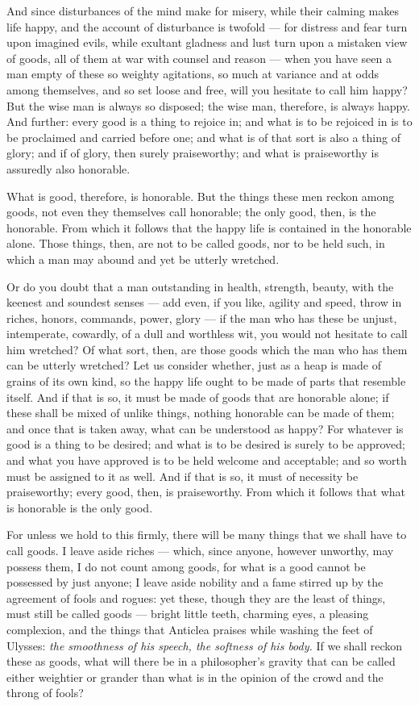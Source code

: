  And since disturbances of the mind make for misery, while their calming makes life happy, and the account of disturbance is twofold — for distress and fear turn upon imagined evils, while exultant gladness and lust turn upon a mistaken view of goods, all of them at war with counsel and reason — when you have seen a man empty of these so weighty agitations, so much at variance and at odds among themselves, and so set loose and free, will you hesitate to call him happy? But the wise man is always so disposed; the wise man, therefore, is always happy. And further: every good is a thing to rejoice in; and what is to be rejoiced in is to be proclaimed and carried before one; and what is of that sort is also a thing of glory; and if of glory, then surely praiseworthy; and what is praiseworthy is assuredly also honorable.

 What is good, therefore, is honorable. But the things these men reckon among goods, not even they themselves call honorable; the only good, then, is the honorable. From which it follows that the happy life is contained in the honorable alone. Those things, then, are not to be called goods, nor to be held such, in which a man may abound and yet be utterly wretched.

 Or do you doubt that a man outstanding in health, strength, beauty, with the keenest and soundest senses — add even, if you like, agility and speed, throw in riches, honors, commands, power, glory — if the man who has these be unjust, intemperate, cowardly, of a dull and worthless wit, you would not hesitate to call him wretched? Of what sort, then, are those goods which the man who has them can be utterly wretched? Let us consider whether, just as a heap is made of grains of its own kind, so the happy life ought to be made of parts that resemble itself. And if that is so, it must be made of goods that are honorable alone; if these shall be mixed of unlike things, nothing honorable can be made of them; and once that is taken away, what can be understood as happy? For whatever is good is a thing to be desired; and what is to be desired is surely to be approved; and what you have approved is to be held welcome and acceptable; and so worth must be assigned to it as well. And if that is so, it must of necessity be praiseworthy; every good, then, is praiseworthy. From which it follows that what is honorable is the only good.

 For unless we hold to this firmly, there will be many things that we shall have to call goods. I leave aside riches — which, since anyone, however unworthy, may possess them, I do not count among goods, for what is a good cannot be possessed by just anyone; I leave aside nobility and a fame stirred up by the agreement of fools and rogues: yet these, though they are the least of things, must still be called goods — bright little teeth, charming eyes, a pleasing complexion, and the things that Anticlea praises while washing the feet of Ulysses: \textit{the smoothness of his speech, the softness of his body.} If we shall reckon these as goods, what will there be in a philosopher's gravity that can be called either weightier or grander than what is in the opinion of the crowd and the throng of fools?

